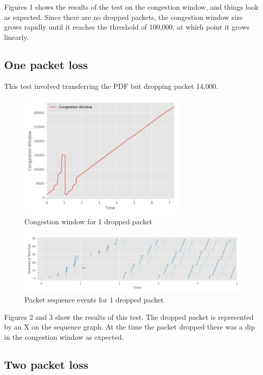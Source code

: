 \documentclass[fleqn,11pt]{article}
\begin{document}
Figures 1 shows the results of the test on the congestion window, and things
look as expected. Since there are no dropped packets, the congestion window
size grows rapidly until it reaches the threshold of 100,000, at which point it
grows linearly.

\newpage

\subsection{One packet loss}

\indent\indent This test involved transferring the PDF but dropping packet
14,000.

\begin{figure}[!htb]
  \centering
  \includegraphics[width=8cm]{../graphs/1-cwnd.png}
  \caption{Congestion window for 1 dropped packet}
  \label{fig:throughput}
\end{figure}

\begin{figure}[!htb]
  \centering
  \includegraphics[width=13cm]{../graphs/1-sequence.png}
  \caption{Packet sequence events for 1 dropped packet}

  \label{fig:throughput}
\end{figure}

Figures 2 and 3 show the results of this test. The dropped packet is
represented by an X on the sequence graph. At the time the packet dropped there
was a dip in the congestion window as expected.

\newpage
\subsection{Two packet loss}
\end{document}
